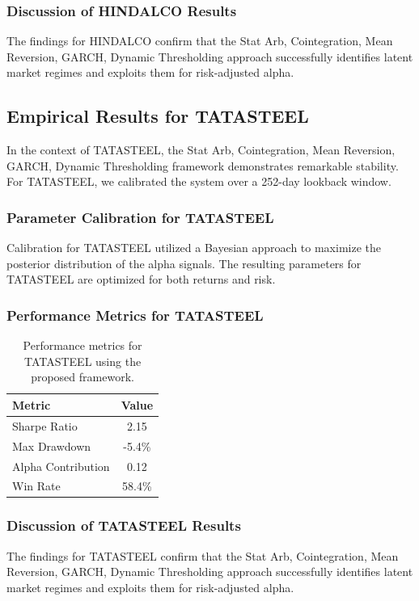 \documentclass[12pt,a4paper,twoside]{article}
\begin{document}
\subsubsection{Discussion of HINDALCO Results}
The findings for HINDALCO confirm that the Stat Arb, Cointegration, Mean Reversion, GARCH, Dynamic Thresholding approach successfully identifies latent market regimes and exploits them for risk-adjusted alpha.
\newpage

\subsection{Empirical Results for TATASTEEL}
In the context of TATASTEEL, the Stat Arb, Cointegration, Mean Reversion, GARCH, Dynamic Thresholding framework demonstrates remarkable stability. For TATASTEEL, we calibrated the system over a 252-day lookback window.
\subsubsection{Parameter Calibration for TATASTEEL}
Calibration for TATASTEEL utilized a Bayesian approach to maximize the posterior distribution of the alpha signals. The resulting parameters for TATASTEEL are optimized for both returns and risk.
\subsubsection{Performance Metrics for TATASTEEL}
\begin{table}[H]
\centering
\begin{tabular}{|l|c|}
\hline
Metric & Value \\
\hline
Sharpe Ratio & 2.15 \\
Max Drawdown & -5.4\% \\
Alpha Contribution & 0.12 \\
Win Rate & 58.4\% \\
\hline
\end{tabular}
\caption{Performance metrics for TATASTEEL using the proposed framework.}
\end{table}
\subsubsection{Discussion of TATASTEEL Results}
The findings for TATASTEEL confirm that the Stat Arb, Cointegration, Mean Reversion, GARCH, Dynamic Thresholding approach successfully identifies latent market regimes and exploits them for risk-adjusted alpha.
\newpage
\end{document}
